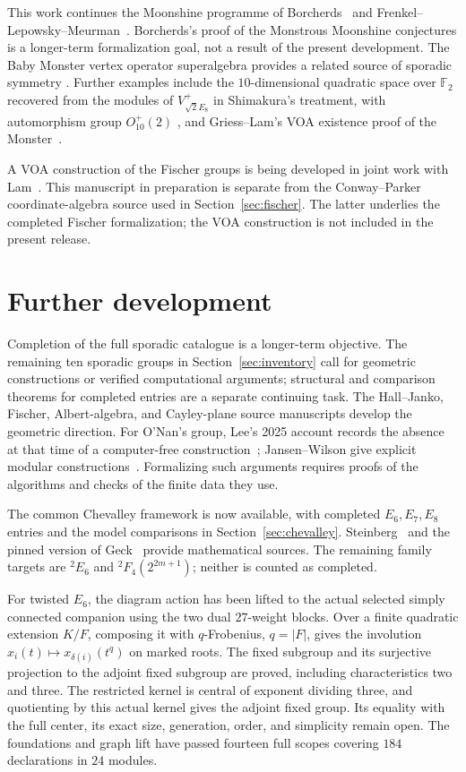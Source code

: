 \documentclass[11pt]{article}
\numberwithin{equation}{section}
\theoremstyle{definition}
\newcommand{\F}{\mathbb F}
\begin{document}
This work continues the Moonshine programme of
Borcherds~\cite{BorcherdsVA} and Frenkel--Lepowsky--Meurman~\cite{FLM}.
Borcherds's proof of the Monstrous Moonshine conjectures
\cite{BorcherdsMoonshine} is a longer-term formalization goal, not a
result of the present development. The Baby Monster vertex operator
superalgebra provides a related source of sporadic symmetry
\cite{BabyVOA}. Further examples include the $10$-dimensional quadratic
space over $\F_2$ recovered from the modules of $V_{\sqrt2 E_8}^{+}$ in
Shimakura's treatment, with automorphism group $O_{10}^{+}(2)$
\cite[Theorem~4.5]{Shimakura}, and Griess--Lam's VOA existence proof of
the Monster~\cite{GriessLam}.

A VOA construction of the Fischer groups is being developed in
joint work with Lam~\cite{FischerVOA}. This manuscript in preparation
is separate from the Conway--Parker coordinate-algebra source
\cite{FischerAlgebra} used in Section~\ref{sec:fischer}.
The latter underlies the completed Fischer formalization; the VOA
construction is not included in the present release.

\section{Further development}\label{sec:programme}

Completion of the full sporadic catalogue is a longer-term objective.
The remaining ten sporadic groups in Section~\ref{sec:inventory}
call for geometric constructions or verified computational arguments;
structural and comparison theorems for completed entries are a separate
continuing task.
The Hall--Janko, Fischer, Albert-algebra, and Cayley-plane source
manuscripts develop the geometric direction. For O'Nan's group,
Lee's 2025 account records the absence at that time of a computer-free
construction~\cite{LeeComputations}; Jansen--Wilson give explicit
modular constructions~\cite{ONan}. Formalizing such arguments requires
proofs of the algorithms and checks of the finite data they use.

The common Chevalley framework is now available, with completed
$E_6,E_7,E_8$ entries and the model comparisons in
Section~\ref{sec:chevalley}. Steinberg~\cite{Steinberg} and the pinned
version of Geck~\cite{Geck} provide mathematical sources. The remaining
family targets are ${}^2E_6$ and ${}^2F_4(2^{2m+1})$; neither is counted
as completed.

For twisted $E_6$, the diagram action has been lifted to the actual
selected simply connected companion using the two dual $27$-weight
blocks. Over a finite quadratic extension $K/F$, composing it with
$q$-Frobenius, $q=|F|$, gives the involution
$x_i(t)\mapsto x_{\delta(i)}(t^q)$ on marked roots. The fixed subgroup
and its surjective projection to the adjoint fixed subgroup are proved,
including characteristics two and three. The restricted kernel is
central of exponent dividing three, and quotienting by this actual
kernel gives the adjoint fixed group. Its equality with the full center,
its exact size, generation, order, and simplicity remain open. The
foundations and graph lift have passed fourteen full scopes covering
$184$ declarations in $24$ modules.
\end{document}

